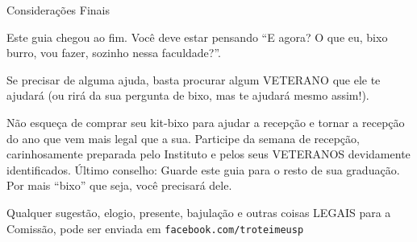 \begin{secao}{Considerações Finais}

Este guia chegou ao fim. Você deve estar pensando ``E agora? O que eu, bixo
burro, vou fazer, sozinho nessa faculdade?''.

Se precisar de alguma ajuda, basta procurar algum VETERANO que ele te
ajudará (ou rirá da sua pergunta de bixo, mas te ajudará mesmo assim!).

Não esqueça de comprar seu kit-bixo para ajudar a recepção e tornar a recepção
do ano que vem mais legal que a sua. Participe da semana de recepção,
carinhosamente preparada pelo Instituto e pelos seus VETERANOS devidamente
identificados. Último conselho: Guarde este guia para o resto de sua graduação.
Por mais ``bixo'' que seja, você precisará dele.

Qualquer sugestão, elogio, presente, bajulação e outras coisas LEGAIS para a
Comissão, pode ser enviada em {\tt facebook.com/troteimeusp}

\end{secao}
